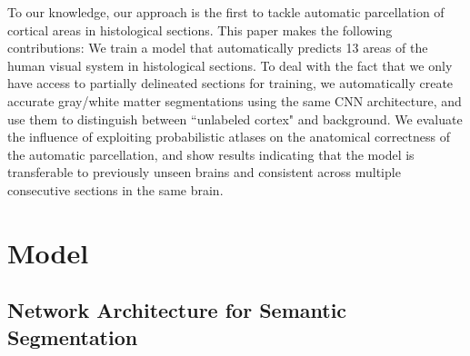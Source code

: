\documentclass{article}
\newcommand\todo[1]{\textcolor{red}{#1}}
\begin{document}
To our knowledge, our approach is the first to tackle automatic parcellation of cortical areas in histological sections.
This paper makes the following contributions:
We train a model that automatically predicts 13 areas of the human visual system in histological sections.
To deal with the fact that we only have access to partially delineated sections for training,
we automatically create accurate gray/white matter segmentations using the same CNN architecture,
and use them to distinguish between ``unlabeled cortex" and background.
We evaluate the influence of exploiting probabilistic atlases on the anatomical correctness of the automatic parcellation, and show results indicating that the model is transferable to previously unseen brains and consistent across multiple consecutive sections in the same brain.



\section{Model}
\label{sec:arch}
%
\subsection{Network Architecture for Semantic Segmentation}
\label{sec:arch:arch}
\vspace*{-.5\baselineskip}
\end{document}

